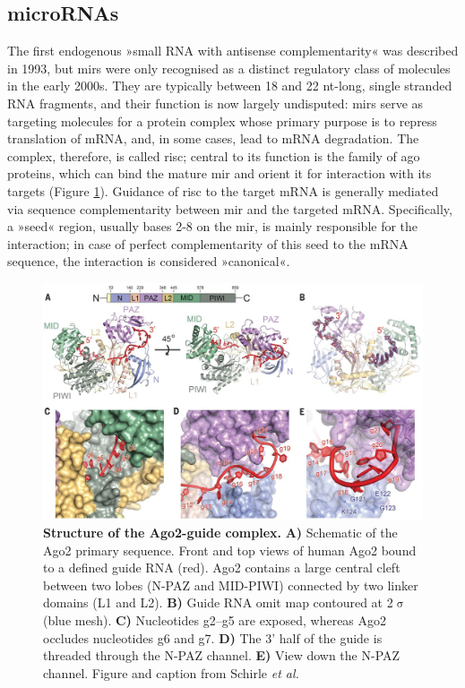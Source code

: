 \subsection{microRNAs} \label{sec:intro:mirna}
The first endogenous »small RNA with antisense complementarity« was described in 1993,\cite{Lee1993} but \acfp{mir} were only recognised as a distinct regulatory class of molecules in the early 2000s. They are typically between 18 and 22 \ac{nt}-long, single stranded RNA fragments, and their function is now largely undisputed: \acp{mir} serve as targeting molecules for a protein complex whose primary purpose is to repress translation of mRNA, and, in some cases, lead to mRNA degradation. The complex, therefore, is called \ac{risc}; central to its function is the family of \ac{ago} proteins, which can bind the mature \ac{mir} and orient it for interaction with its targets (Figure \ref{fig:schirle2014}).\cite{Elkayam2012} Guidance of \ac{risc} to the target mRNA is generally mediated via sequence complementarity between \ac{mir} and the targeted mRNA. Specifically, a »seed« region, usually bases 2-8 on the \ac{mir}, is mainly responsible for the interaction; in case of perfect complementarity of this seed to the mRNA sequence, the interaction is considered »canonical«.\cite{Schirle2014}

\begin{figure}
\includegraphics[width=\textwidth]{figures/schirle2014}
\caption[Structure of the Ago2-guide complex.]{\textbf{Structure of the Ago2-guide complex.} \textbf{A)} Schematic of the Ago2 primary sequence. Front and top views of human Ago2 bound to a defined guide RNA (red). Ago2 contains a large central cleft between two lobes (N-PAZ and MID-PIWI) connected by two linker domains (L1 and L2). \textbf{B)} Guide RNA omit map contoured at 2$\upsigma$ (blue mesh). \textbf{C)} Nucleotides g2–g5 are exposed, whereas Ago2 occludes nucleotides g6 and g7. \textbf{D)} The 3' half of the guide is threaded through the N-PAZ channel. \textbf{E)} View down the N-PAZ channel. Figure and caption from Schirle \emph{et al.}\cite{Schirle2014}
\label{fig:schirle2014}}
\end{figure}


